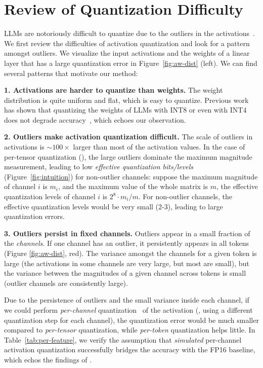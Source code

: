 \section{Review of Quantization Difficulty}
LLMs are notoriously difficult to quantize due to the outliers in the activations~\citep{dettmers2022llmint8,outlier_suppression,bondarenko2021understanding}.
We first review the difficulties of activation quantization and look for a pattern amongst outliers.
We visualize the input activations and the weights of a linear layer that has a large quantization error in Figure~\ref{fig:aw-dist} (left). We can find several patterns that motivate our method:

\textbf{1. Activations are harder to quantize than weights. } The weight distribution is quite uniform and flat, which is easy to quantize. Previous work has shown that quantizing the weights of LLMs with INT8 or even with INT4 does not degrade accuracy~\cite{dettmers2022llmint8,zeroquant,zeng2022glm}, which echoes our observation.

\textbf{2. Outliers make activation quantization difficult.} The scale of outliers in activations is $\sim 100\times$ larger than most of the activation values.
In the case of per-tensor quantization (), the large outliers dominate the maximum magnitude measurement, leading to low \emph{effective quantization bits/levels} (Figure~\ref{fig:intuition}) for non-outlier channels:
suppose the maximum magnitude of channel $i$ is $m_i$, and the maximum value of the whole matrix is $m$, the effective quantization levels of channel $i$ is $2^8 \cdot m_i/m$. For non-outlier channels, the effective quantization levels would be very small (2-3), leading to large quantization errors.

\textbf{3. Outliers persist in fixed channels. } Outliers appear in a small fraction of the \emph{channels}. If one channel has an outlier, it persistently appears in all tokens (Figure \ref{fig:aw-dist}, red).
The variance amongst the channels for a given token is large (the activations in some channels are very large, but most are small), but the variance between the magnitudes of a given channel across tokens is small (outlier channels are consistently large).

Due to the persistence of outliers and the small variance inside each channel, if we could perform \emph{per-channel} quantization~\cite{bondarenko2021understanding} of the activation (\ie, using a different quantization step for each channel), the quantization error would be much smaller compared to \emph{per-tensor} quantization, while \emph{per-token} quantization helps little.
In Table~\ref{tab:per-feature}, we verify the assumption that \textit{simulated} per-channel activation quantization successfully bridges the accuracy with the FP16 baseline, which echos the findings of \citeauthor{bondarenko2021understanding}.

